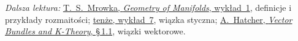 \par\smallskip
{\footnotesize\noindent\emph{Dalsza lektura:}
\href{https://www.ocw.mit.edu/courses/18-965-geometry-of-manifolds-fall-2004/34fad8f392208544e2b1e9794c33cbe7_lecture1.pdf}
{T.~S.~Mrowka, \emph{Geometry of Manifolds}, wykład~1},
definicje i przykłady rozmaitości;
\href{https://www.ocw.mit.edu/courses/18-965-geometry-of-manifolds-fall-2004/de18bf0029c583cacffb09810879bb54_lecture7.pdf}
{tenże, wykład~7}, wiązka styczna;
\href{https://pi.math.cornell.edu/~hatcher/VBKT/VB.pdf}
{A.~Hatcher, \emph{Vector Bundles and K-Theory}, \S\,1.1},
wiązki wektorowe.\par}

\clearpage
